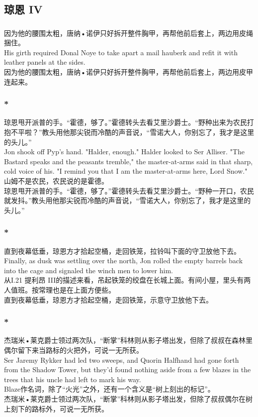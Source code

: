 \documentclass[12pt,a4paper]{article}
\newcommand{\h}[1]{{\color{red}#1}\\}
\newcommand{\la}[1]{{\color{blue}#1}\\}
\begin{document}
\subsection{琼恩 IV}
\subsubsection{}\la{
因为他的腰围太粗，唐纳•诺伊只好拆开整件胸甲，再帮他前后套上，两边用皮绳捆住。\\
His girth required Donal Noye to take apart a mail hauberk and refit it with leather panels at the sides. }
因为他的腰围太粗，唐纳•诺伊只好拆开整件胸甲，再帮他前后套上，两边用皮甲连起来。

\subsubsection{\color{red}*}\la{
	琼恩甩开派普的手。“霍德，够了。”霍德转头去看艾里沙爵士。“野种出来为农民打抱不平啦？”教头用他那尖锐而冷酷的声音说，“雪诺大人，你别忘了，我才是这里的头儿。”\\
	Jon shook off Pyp's hand. "Halder, enough." Halder looked to Ser Alliser. "The Bastard speaks and the peasants tremble," the master-at-arms said in that sharp, cold voice of his. "I remind you that I am the master-at-arms here, Lord Snow."}\h{
	山姆不是农民，农民说的是霍德。}
	琼恩甩开派普的手。“霍德，够了。”霍德转头去看艾里沙爵士。“野种一开口，农民就发抖。”教头用他那尖锐而冷酷的声音说，“雪诺大人，你别忘了，我才是这里的头儿。”
	
\subsubsection{\color{red}*}\la{
	直到夜幕低垂，琼恩方才拾起空桶，走回铁笼，拉铃叫下面的守卫放他下去。\\
	Finally, as dusk was settling over the north, Jon rolled the empty barrels back into the cage and signaled the winch men to lower him.}\h{
	从I.21 提利昂 III的描述来看，吊起铁笼的绞盘在长城上面。有间小屋，里头有两人值班。按常理也是在上面方便些。}
	直到夜幕低垂，琼恩方才拾起空桶，走回铁笼，示意守卫放他下去。
	
\subsubsection{\color{red}*}\la{
	杰瑞米•莱克爵士领过两次队，“断掌”科林则从影子塔出发，但除了叔叔在森林里偶尔留下来当路标的火把外，可说一无所获。\\
	Ser Jaremy Rykker had led two sweeps, and Quorin Halfhand had gone forth from the Shadow Tower, but they'd found nothing aside from a few blazes in the trees that his uncle had left to mark his way. }\h{
	Blaze作名词，除了“火光”之外，还有一个含义是“树上刻出的标记”。}
	杰瑞米•莱克爵士领过两次队，“断掌”科林则从影子塔出发，但除了叔叔偶尔在树上刻下的路标外，可说一无所获。
	
\end{document}
